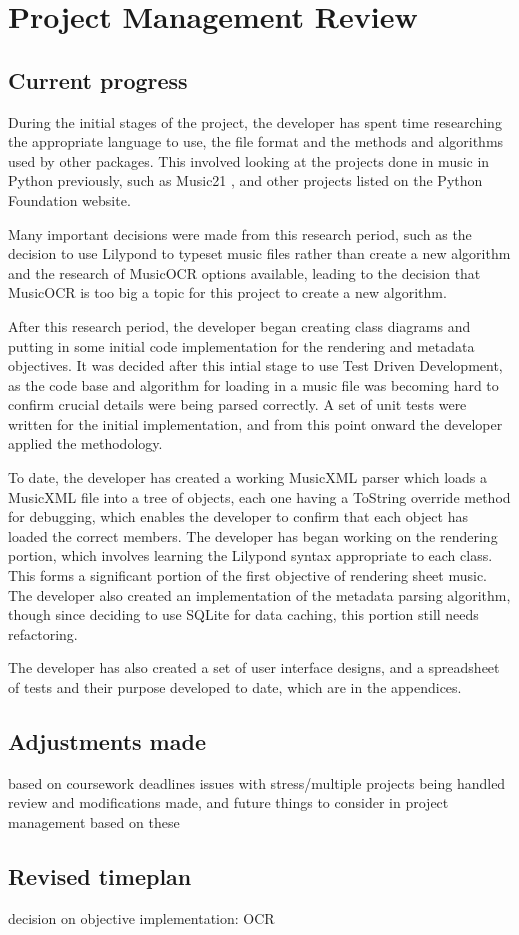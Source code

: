\section{Project Management Review}
\subsection{Current progress}
During the initial stages of the project, the developer has spent time researching the appropriate language to use, the file format and the methods and algorithms used by other packages. This involved looking at the projects done in music in Python previously, such as Music21 \parencite{Music21}, and other projects listed on the Python Foundation website\parencite{pmus}. 

Many important decisions were made from this research period, such as the decision to use Lilypond to typeset music files rather than create a new algorithm and the research of MusicOCR options available, leading to the decision that MusicOCR is too big a topic for this project to create a new algorithm.

After this research period, the developer began creating class diagrams and putting in some initial code implementation for the rendering and metadata objectives. It was decided after this intial stage to use Test Driven Development, as the code base and algorithm for loading in a music file was becoming hard to confirm crucial details were being parsed correctly. A set of unit tests were written for the initial implementation, and from this point onward the developer applied the methodology.

To date, the developer has created a working MusicXML parser which loads a MusicXML file into a tree of objects, each one having a ToString override method for debugging, which enables the developer to confirm that each object has loaded the correct members. The developer has began working on the rendering portion, which involves learning the Lilypond syntax appropriate to each class. This forms a significant portion of the first objective of rendering sheet music.
The developer also created an implementation of the metadata parsing algorithm, though since deciding to use SQLite for data caching, this portion still needs refactoring.

The developer has also created a set of user interface designs, and a spreadsheet of tests and their purpose developed to date, which are in the appendices.
\subsection{Adjustments made}
based on coursework deadlines
issues with stress/multiple projects being handled
review and modifications made, and future things to consider in project management based on these

\subsection{Revised timeplan}
decision on objective implementation: OCR